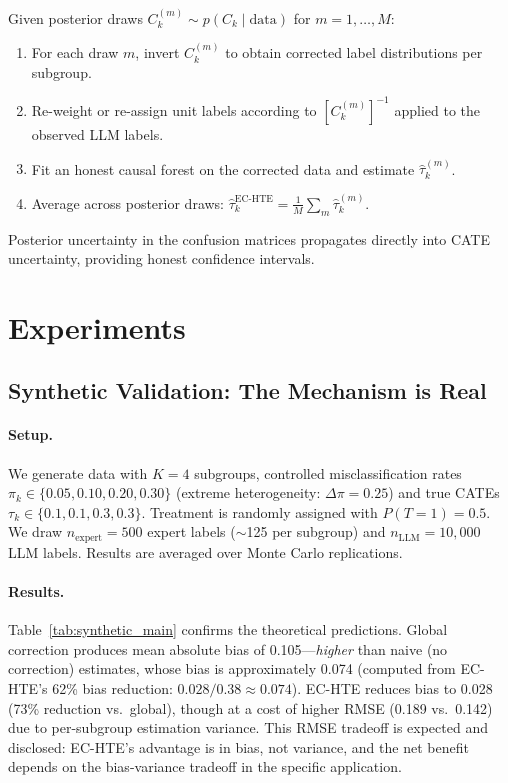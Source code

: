 \documentclass[11pt,a4paper]{article}
\begin{document}
Given posterior draws $C_k^{(m)} \sim p(C_k \mid \text{data})$ for $m = 1,\ldots,M$:
\begin{enumerate}
    \item For each draw $m$, invert $C_k^{(m)}$ to obtain corrected label distributions per subgroup.
    \item Re-weight or re-assign unit labels according to $[C_k^{(m)}]^{-1}$ applied to the observed LLM labels.
    \item Fit an honest causal forest \cite{wager2018estimation} on the corrected data and estimate $\hat{\tau}_k^{(m)}$.
    \item Average across posterior draws: $\hat{\tau}_k^{\text{EC-HTE}} = \frac{1}{M}\sum_m \hat{\tau}_k^{(m)}$.
\end{enumerate}

Posterior uncertainty in the confusion matrices propagates directly into CATE uncertainty, providing honest confidence intervals.


\section{Experiments}
\label{sec:experiments}

\subsection{Synthetic Validation: The Mechanism is Real}
\label{sec:synthetic}

\paragraph{Setup.}
We generate data with $K=4$ subgroups, controlled misclassification rates $\pi_k \in \{0.05, 0.10, 0.20, 0.30\}$ (extreme heterogeneity: $\Delta\pi = 0.25$) and true CATEs $\tau_k \in \{0.1, 0.1, 0.3, 0.3\}$.
Treatment is randomly assigned with $P(T=1)=0.5$.
We draw $n_{\text{expert}} = 500$ expert labels ($\sim$125 per subgroup) and $n_{\text{LLM}} = 10{,}000$ LLM labels.
Results are averaged over Monte Carlo replications.

\paragraph{Results.}
Table~\ref{tab:synthetic_main} confirms the theoretical predictions.
Global correction produces mean absolute bias of 0.105---\emph{higher} than naive (no correction) estimates, whose bias is approximately 0.074 (computed from EC-HTE's 62\% bias reduction: $0.028 / 0.38 \approx 0.074$).
EC-HTE reduces bias to 0.028 (73\% reduction vs.\ global), though at a cost of higher RMSE (0.189 vs.\ 0.142) due to per-subgroup estimation variance.
This RMSE tradeoff is expected and disclosed: EC-HTE's advantage is in bias, not variance, and the net benefit depends on the bias-variance tradeoff in the specific application.
\end{document}
